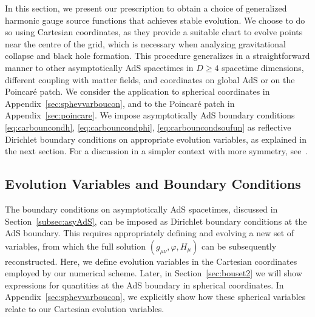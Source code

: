\documentclass[aps,letterpaper,twocolumn,nofootinbib]{revtex4}
\numberwithin{equation}{section}
\begin{document}
In this section, we present our prescription to obtain a choice of generalized harmonic gauge source functions that achieves stable evolution.
We choose to do so using Cartesian coordinates, as they provide a suitable chart to evolve points near the centre of the grid, which is necessary when analyzing gravitational collapse and black hole formation. 
This procedure generalizes in a straightforward manner to other asymptotically AdS spacetimes in $D\geq 4$ spacetime dimensions, different coupling with matter fields, and coordinates on global AdS or on the Poincar\'{e} patch. We consider the application to spherical coordinates in Appendix~\ref{sec:sphevvarboucon}, and to the Poincar\'e patch in Appendix~\ref{sec:poincare}.
We impose asymptotically AdS boundary conditions \eqref{eq:carbouncondh}, \eqref{eq:carbouncondphi}, \eqref{eq:carbouncondsoufun} as reflective Dirichlet boundary conditions on appropriate evolution variables, as explained in the next section.
For a discussion in a simpler context with more symmetry, see~\cite{Bantilan:2012vu}.

\subsection{Evolution Variables and Boundary Conditions}\label{subsec:cartevvarboucon}

The boundary conditions on asymptotically AdS spacetimes, discussed in Section~\ref{subsec:asyAdS}, can be imposed as Dirichlet boundary conditions at the AdS boundary.
This requires appropriately defining and evolving a new set of variables, from which the full solution $(g_{\mu\nu},\varphi,H_\mu)$ can be subsequently reconstructed. 
Here, we define evolution variables in the Cartesian coordinates employed by our numerical scheme.
Later, in Section~\ref{sec:bouset2} we will show expressions for quantities at the AdS boundary in spherical coordinates.
In Appendix~\ref{sec:sphevvarboucon}, we explicitly show how these spherical variables relate to our Cartesian evolution variables.
\end{document}
